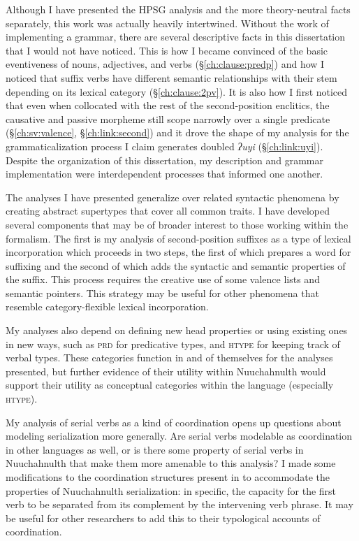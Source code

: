 Although I have presented the HPSG analysis and the more theory-neutral facts separately, this work was actually heavily intertwined. Without the work of implementing a grammar, there are several descriptive facts in this dissertation that I would not have noticed. This is how I became convinced of the basic eventiveness of nouns, adjectives, and verbs (\S\ref{ch:clause:predp}) and how I noticed that suffix verbs have different semantic relationships with their stem depending on its lexical category (\S\ref{ch:clause:2pv}). It is also how I first noticed that even when collocated with the rest of the second-position enclitics, the causative and passive morpheme still scope narrowly over a single predicate (\S\ref{ch:sv:valence}, \S\ref{ch:link:second}) and it drove the shape of my analysis for the grammaticalization process I claim generates doubled \textit{ʔuyi} (\S\ref{ch:link:uyi}). Despite the organization of this dissertation, my description and grammar implementation were interdependent processes that informed one another.

The analyses I have presented generalize over related syntactic phenomena by creating abstract supertypes that cover all common traits. I have developed several components that may be of broader interest to those working within the formalism. The first is my analysis of second-position suffixes as a type of lexical incorporation which proceeds in two steps, the first of which prepares a word for suffixing and the second of which adds the syntactic and semantic properties of the suffix. This process requires the creative use of some valence lists and semantic pointers. This strategy may be useful for other phenomena that resemble category-flexible lexical incorporation.%

My analyses also depend on defining new head properties or using existing ones in new ways, such as \textsc{prd} for predicative types, and \textsc{htype} for keeping track of verbal types. These categories function in and of themselves for the analyses presented, but further evidence of their utility within Nuuchahnulth would support their utility as conceptual categories within the language (especially \textsc{htype}).

My analysis of serial verbs as a kind of coordination opens up questions about modeling serialization more generally. Are serial verbs modelable as coordination in other languages as well, or is there some property of serial verbs in Nuuchahnulth that make them more amenable to this analysis? I made some modifications to the coordination structures present in \citet{drellishakbender2005} to accommodate the properties of Nuuchahnulth serialization: in specific, the capacity for the first verb to be separated from its complement by the intervening verb phrase. It may be useful for other researchers to add this to their typological accounts of coordination.

